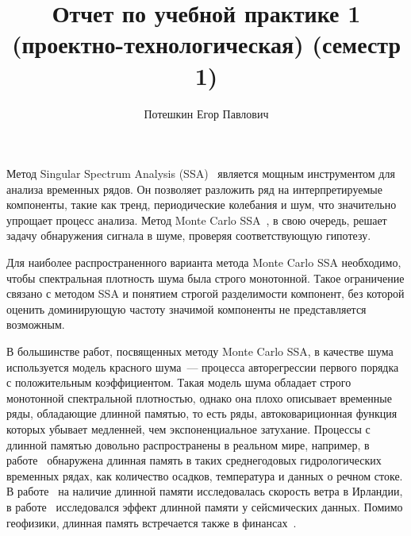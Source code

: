 \documentclass[specialist,
substylefile = spbu_report.rtx,
subf,href,colorlinks=true, 12pt]{disser}
\theoremstyle{definition}
\begin{document}
%
%

\title{Отчет по учебной практике 1 (проектно-технологическая) (семестр 1)}


\author{Потешкин Егор Павлович}


\date{\number\year}

\maketitle

\tableofcontents

\intro
Метод Singular Spectrum Analysis (SSA)~\cite{Broomhead1986,Golyandina2001} является мощным инструментом для анализа временных рядов. Он позволяет разложить ряд на интерпретируемые компоненты, такие как тренд, периодические колебания и шум, что значительно упрощает процесс анализа. Метод Monte Carlo SSA~\cite{Allen1996}, в свою очередь, решает задачу обнаружения сигнала в шуме, проверяя соответствующую гипотезу.

Для наиболее распространенного варианта метода Monte Carlo SSA необходимо, чтобы спектральная плотность шума была строго монотонной. Такое ограничение связано с методом SSA и понятием строгой разделимости компонент, без которой оценить доминирующую частоту значимой компоненты не представляется возможным.

В большинстве работ, посвященных методу Monte Carlo SSA, в качестве шума используется модель красного шума~--- процесса авторегрессии первого порядка с положительным коэффициентом. Такая модель шума обладает строго монотонной спектральной плотностью, однако она плохо описывает временные ряды, обладающие длинной памятью, то есть ряды, автоковариционная функция которых убывает медленней, чем экспоненциальное затухание. Процессы с длинной памятью довольно распространены в реальном мире, например, в работе~\cite{Hipel1994} обнаружена длинная память в таких среднегодовых гидрологических временных рядах, как количество осадков, температура и данных о речном стоке. В работе~\cite{Haslett1989} на наличие длинной памяти исследовалась скорость ветра в Ирландии, в работе~\cite{Mariani2020} исследовался эффект длинной памяти у сейсмических данных. Помимо геофизики, длинная память встречается также в финансах~\cite{Barkoulas1997,Guglielmo2019}.
\end{document}
